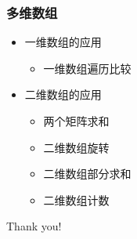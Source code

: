 \begin{frame}[fragile]
    \frametitle{多维数组}

    \begin{itemize}
        \item<1-> 一维数组的应用
        
            \begin{itemize}
                \item 一维数组遍历比较
            \end{itemize}

        \item<2-> 二维数组的应用
        
            \begin{itemize}
                \item 两个矩阵求和
                \item 二维数组旋转
                \item 二维数组部分求和
                \item 二维数组计数
            \end{itemize}

    \end{itemize}
\end{frame}

\begin{frame}
    \begin{center}
        {\Huge Thank you!}
    \end{center}
\end{frame}


